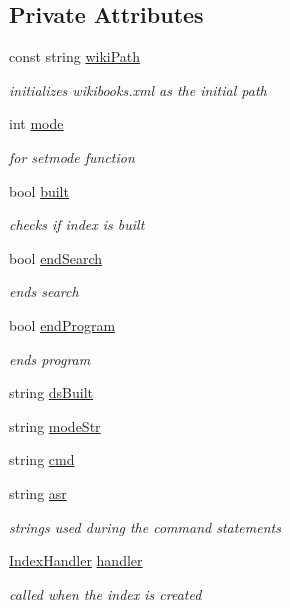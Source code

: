 \subsection*{Private Attributes}
\begin{DoxyCompactItemize}
\item 
const string \hyperlink{class_interface_a2dca5f7e2ddb5d7bf82c9eaf8f3a17eb}{wiki\+Path}
\begin{DoxyCompactList}\small\item\em initializes wikibooks.\+xml as the initial path \end{DoxyCompactList}\item 
int \hyperlink{class_interface_a272ffd81b79f689429ef27b6e8345fcf}{mode}
\begin{DoxyCompactList}\small\item\em for setmode function \end{DoxyCompactList}\item 
bool \hyperlink{class_interface_abd6ccab6c911d4beaaa8531036a92413}{built}
\begin{DoxyCompactList}\small\item\em checks if index is built \end{DoxyCompactList}\item 
bool \hyperlink{class_interface_acd8a62dd37c5774058cbaee915b0d9fe}{end\+Search}
\begin{DoxyCompactList}\small\item\em ends search \end{DoxyCompactList}\item 
bool \hyperlink{class_interface_a81680e55e0deb21de6e1c7d802ccf2b8}{end\+Program}
\begin{DoxyCompactList}\small\item\em ends program \end{DoxyCompactList}\item 
string \hyperlink{class_interface_a913b1344fae6395837321a94cc9f05dc}{ds\+Built}
\item 
string \hyperlink{class_interface_a1898f75ce60e62537678004d2dd5b627}{mode\+Str}
\item 
string \hyperlink{class_interface_a10aa4deaad9c9a974ae522771f95a274}{cmd}
\item 
string \hyperlink{class_interface_a6dd99aca069dbc1054642d4c855b2c42}{asr}
\begin{DoxyCompactList}\small\item\em strings used during the command statements \end{DoxyCompactList}\item 
\hyperlink{class_index_handler}{Index\+Handler} \hyperlink{class_interface_a596b02db00f1f13e0955444504c3752c}{handler}
\begin{DoxyCompactList}\small\item\em called when the index is created \end{DoxyCompactList}\end{DoxyCompactItemize}



